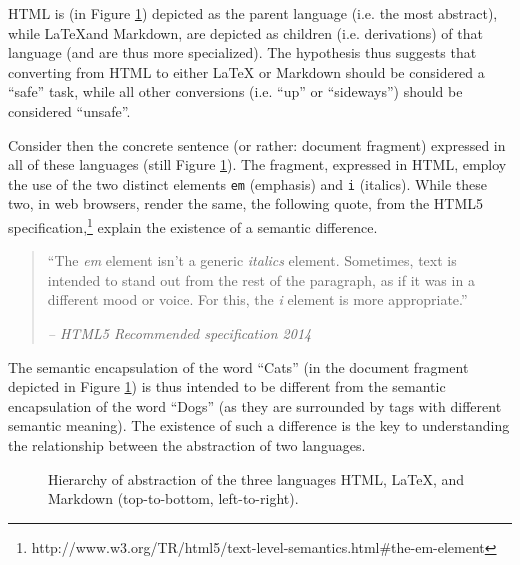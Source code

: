 \documentclass{scrreprt}
\begin{document}
HTML is (in Figure \ref{fig:hierarchy-of-abstraction-example-tree}) depicted as the parent language (i.e. the most abstract), while \LaTeX and Markdown, are depicted as children (i.e. derivations) of that language (and are thus more specialized). The hypothesis thus suggests that converting from HTML to either \LaTeX{} or Markdown should be considered a ``safe'' task, while all other conversions (i.e. ``up'' or ``sideways'') should be considered ``unsafe''.

Consider then the concrete sentence (or rather: document fragment) expressed in all of these languages (still Figure \ref{fig:hierarchy-of-abstraction-example-tree}). The fragment, expressed in HTML, employ the use of the two distinct elements \texttt{em} (emphasis) and \texttt{i} (italics). While these two, in web browsers, render the same, the following quote, from the HTML5 specification,\footnote{http://www.w3.org/TR/html5/text-level-semantics.html\#the-em-element} explain the existence of a semantic difference.

\begin{quote}
``The \emph{em} element isn't a generic \emph{italics} element. Sometimes, text is intended to stand out from the rest of the paragraph, as if it was in a different mood or voice. For this, the \emph{i} element is more appropriate.''
\begin{flushright}
\textit{-- HTML5 Recommended specification 2014}
\end{flushright}
\end{quote}

The semantic encapsulation of the word ``Cats'' (in the document fragment depicted in Figure \ref{fig:hierarchy-of-abstraction-example-tree}) is thus intended to be different from the semantic encapsulation of the word ``Dogs'' (as they are surrounded by tags with different semantic meaning). The existence of such a difference is the key to understanding the relationship between the abstraction of two languages.

\begin{figure}[h]
  \centering

  \caption{Hierarchy of abstraction of the three languages HTML, \LaTeX, and Markdown (top-to-bottom, left-to-right).}
  \label{fig:hierarchy-of-abstraction-example-tree}
\end{figure}
\end{document}
